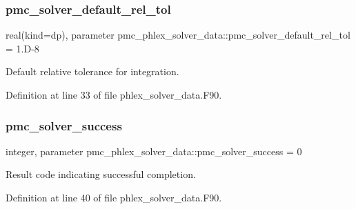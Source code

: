 \subsubsection{\texorpdfstring{pmc\+\_\+solver\+\_\+default\+\_\+rel\+\_\+tol}{pmc\_solver\_default\_rel\_tol}}
{\footnotesize\ttfamily real(kind=dp), parameter pmc\+\_\+phlex\+\_\+solver\+\_\+data\+::pmc\+\_\+solver\+\_\+default\+\_\+rel\+\_\+tol = 1.\+D-\/8\hspace{0.3cm}{\ttfamily [private]}}



Default relative tolerance for integration. 



Definition at line 33 of file phlex\+\_\+solver\+\_\+data.\+F90.

\mbox{\label{namespacepmc__phlex__solver__data_a0f2dcefeefc3ce9e4eb9e337c5203054}} 
\subsubsection{\texorpdfstring{pmc\+\_\+solver\+\_\+success}{pmc\_solver\_success}}
{\footnotesize\ttfamily integer, parameter pmc\+\_\+phlex\+\_\+solver\+\_\+data\+::pmc\+\_\+solver\+\_\+success = 0\hspace{0.3cm}{\ttfamily [private]}}



Result code indicating successful completion. 



Definition at line 40 of file phlex\+\_\+solver\+\_\+data.\+F90.

